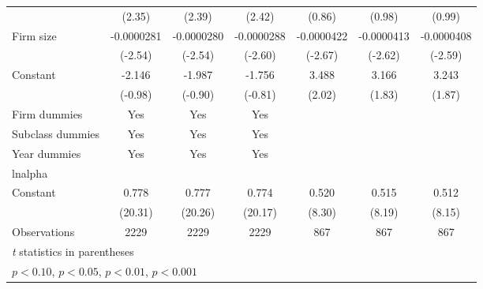 \begin{sidewaystable}[h!]
{\begin{tabular}{l*{6}{c}}
                    &      (2.35)         &      (2.39)         &      (2.42)         &      (0.86)         &      (0.98)         &      (0.99)         \\
\addlinespace
Firm size           &  -0.0000281\sym{*}  &  -0.0000280\sym{*}  &  -0.0000288\sym{**} &  -0.0000422\sym{**} &  -0.0000413\sym{**} &  -0.0000408\sym{**} \\
                    &     (-2.54)         &     (-2.54)         &     (-2.60)         &     (-2.67)         &     (-2.62)         &     (-2.59)         \\
\addlinespace
Constant            &      -2.146         &      -1.987         &      -1.756         &       3.488\sym{*}  &       3.166\sym{+}  &       3.243\sym{+}  \\
                    &     (-0.98)         &     (-0.90)         &     (-0.81)         &      (2.02)         &      (1.83)         &      (1.87)         \\
\addlinespace
Firm dummies&Yes&Yes&Yes\\
\addlinespace
Subclass dummies&Yes&Yes&Yes\\
\addlinespace
Year dummies&Yes&Yes&Yes\\
\midrule
lnalpha             &                     &                     &                     &                     &                     &                     \\
Constant            &       0.778\sym{***}&       0.777\sym{***}&       0.774\sym{***}&       0.520\sym{***}&       0.515\sym{***}&       0.512\sym{***}\\
                    &     (20.31)         &     (20.26)         &     (20.17)         &      (8.30)         &      (8.19)         &      (8.15)         \\
\midrule
Observations        &        2229         &        2229         &        2229         &         867         &         867         &         867         \\
\bottomrule
\multicolumn{7}{l}{\footnotesize \textit{t} statistics in parentheses}\\
\multicolumn{7}{l}{\footnotesize \sym{+} \(p<0.10\), \sym{*} \(p<0.05\), \sym{**} \(p<0.01\), \sym{***} \(p<0.001\)}\\
\end{tabular}
}
\end{sidewaystable}

